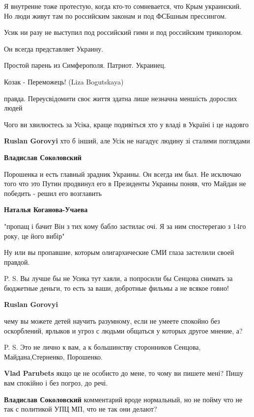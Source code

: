 \begin{itemize}
\begin{itemize}
Я внутренне тоже протестую, когда кто-то сомневается, что Крым украинский. Но
люди живут там по российским законам и под ФСБшным прессингом.

Усик ни разу не выступил под российский гимн и под российским триколором.

Он всегда представляет Украину.

Простой парень из Симферополя. Патриот. Украинец.

Козак - Переможець! (Liza Bogutskaya)

правда. Переусвідомити своє життя здатна лише незначна меншість дорослих людей

Чого ви хвилюєтесь за Усіка, краще подивіться хто у владі в Україні і це надовго

\textbf{Ruslan Gorovyi} хто б інший, але Усік не нагадує людину зі сталими поглядами

\textbf{Владислав Соколовский} 

Порошенка и есть главный зрадник Украины. Он всегда им был. Не исключаю того
что это Путин продвинул его в Президенты Украины поняв, что Майдан не победить
- решил его возглавить

\textbf{Наталья Коганова-Учаева} 

"пропащ і бачит Він з тих кому бабло застилає очі. Я за ним спостерегаю з 14го
року, це його вибір"

Ну или вы пропавшие, которым олигархические СМИ глаза застелили своей правдой.

P. S. Вы лучше бы не Усика тут хаяли, а попросили бы Сенцова снимать за
бюджетные деньги, то есть за ваши, добротные фильмы а не всякое говно!


\textbf{Ruslan Gorovyi} 

чему вы можете детей научить разумному, если не умеете спокойно без
оскорблений, ярлыков и угроз с людьми общаться у которых другое мнение, а?

P. S. Это не лично к вам, а к большинству сторонников Сенцова,
Майдана,Стерненко, Порошенко.


\textbf{Vlad Parubets} якщо це не особисто до мене, то чому ви пишете мені? Пишу вам спокійно і без погроз, до речі.

\textbf{Владислав Соколовский} комментарий вроде нормальный, но не пойму что не так с политикой УПЦ МП, что не так они делают?


\end{itemize}
\end{itemize}
